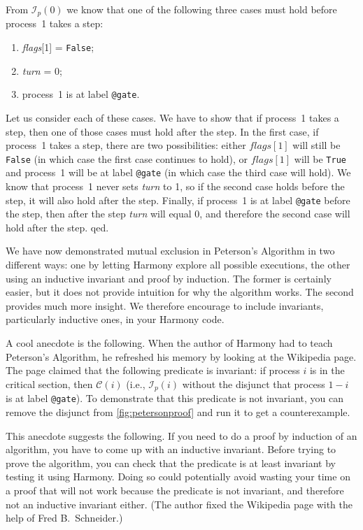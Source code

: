 \documentclass{report}
\begin{document}
From $\mathcal{I}_p(0)$ we know that one of the following three cases must hold before
process~1 takes a step:
\begin{enumerate}
\item \textit{flags}[1] = \texttt{False};
\item \textit{turn} = 0;
\item process~1 is at label \texttt{@gate}.
\end{enumerate}

Let us consider each of these cases.
We have to show that if process~1 takes a step, then one of those
cases must hold after the step.
In the first case, if process~1 takes a step, there are two possibilities:
either $flags[1]$ will still be \texttt{False} (in which case the first case
continues to hold), or $flags[1]$ will be \texttt{True}
and process~1 will be at label \texttt{@gate} (in which case the third case
will hold).
We know that process~1 never sets \textit{turn} to 1, so
if the second case holds before the step, it will also hold after the step.
Finally, if process~1 is at label \texttt{@gate} before the step, then after
the step \textit{turn} will equal 0, and therefore the second case will hold
after the step.  qed.

We have now demonstrated mutual exclusion in Peterson's Algorithm in two
different ways: one by letting Harmony explore all possible executions, the
other using an inductive invariant and proof by induction.  The former
is certainly easier, but it does not provide intuition for why the
algorithm works.  The second provides much more insight.  We therefore
encourage to include invariants, particularly inductive ones, in your
Harmony code.

A cool anecdote is the following.  When the author of Harmony had to teach
Peterson's Algorithm, he refreshed his memory by looking at the Wikipedia
page.  The page claimed that the following predicate is invariant:
if process $i$ is in the critical section, then $\mathcal{C}(i)$ (i.e.,
$\mathcal{I}_p(i)$ without the disjunct that process $1-i$ is at label \texttt{@gate}).
To demonstrate that this predicate is not invariant, you can remove the
disjunct from \autoref{fig:petersonproof} and run it to get a
counterexample.

This anecdote suggests the following.  If you need to do a proof by induction
of an algorithm, you have to come up with an inductive invariant.
Before trying to prove the algorithm, you can check that the predicate is
at least invariant by testing it using Harmony.  Doing so could potentially
avoid wasting your time on a proof that will not work because the
predicate is not invariant, and therefore not an inductive invariant either.
(The author fixed the Wikipedia page with the help of Fred B.~Schneider.)
\end{document}
